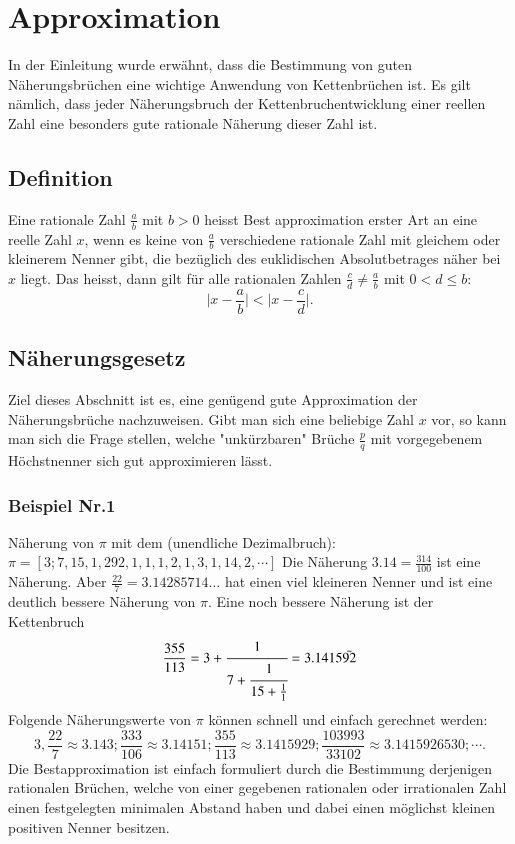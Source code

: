 %
%
%
\section{Approximation
\label{kettenbruch:section:Approximation}}

In der Einleitung wurde erwähnt, dass die Bestimmung von guten
Näherungsbrüchen eine wichtige Anwendung von Kettenbrüchen ist. Es
gilt nämlich, dass jeder Näherungsbruch der Kettenbruchentwicklung
einer reellen Zahl eine besonders gute rationale Näherung dieser
Zahl ist.

\subsection{Definition}

Eine rationale Zahl $\frac{a}{b}$ mit $b>0$ heisst Best approximation
erster Art an eine reelle Zahl $x$, wenn es keine von $\frac{a}{b}$
verschiedene rationale Zahl mit gleichem oder kleinerem Nenner gibt,
die bezüglich des euklidischen Absolutbetrages näher bei $x$ liegt.
Das heisst, dann gilt für alle rationalen Zahlen $\frac{c}{d} \ne
\frac{a}{b}$ mit $0<d\le b$:
\begin{equation}
\biggl|x-\frac{a}{b}\biggr| < \biggl| x-\frac{c}{d}\biggr|.
\end{equation}

\subsection{Näherungsgesetz}
Ziel dieses Abschnitt ist es, eine genügend gute Approximation der
Näherungsbrüche nachzuweisen. Gibt man sich eine beliebige Zahl $x$
vor, so kann man sich die Frage stellen, welche "unkürzbaren" Brüche
$\frac{p}{q}$ mit vorgegebenem Höchstnenner sich gut approximieren
lässt.

\subsubsection{Beispiel Nr.1}
Näherung von $\pi$ mit dem (unendliche Dezimalbruch):
$\pi = [3;7,15,1,292,1,1,1,2,1,3,1,14,2,\cdots]$
Die Näherung $3.14 = \frac{314}{100}$ ist eine Näherung. Aber
$\frac{22}{7} = 3.14285714\dots$ hat einen viel kleineren Nenner und
ist eine deutlich bessere Näherung von $\pi$.
Eine noch bessere Näherung ist der Kettenbruch
\begin{equation}
\frac{355}{113} = 3 + \cfrac{1}{7+\cfrac{1}{15+\frac{1}{1}}} = 3.1415\bar{92}
\end{equation}
Folgende Näherungswerte von $\pi$ können schnell und einfach gerechnet werden:
\begin{equation}
3,\frac{22}{7} \approx 3.143 ; \frac{333}{106} \approx 3.14151 ; \frac{355}{113} \approx 3.1415929 ; \frac{103993}{33102} \approx 3.1415926530 ; \cdots.
\end{equation}
Die Bestapproximation ist einfach formuliert durch die Bestimmung
derjenigen rationalen Brüchen, welche von einer gegebenen rationalen
oder irrationalen Zahl einen festgelegten minimalen Abstand haben
und dabei einen möglichst kleinen positiven Nenner besitzen.

